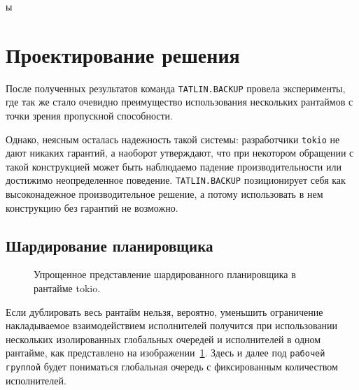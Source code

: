ы%

\section{Проектирование решения}

После полученных результатов команда \verb|TATLIN.BACKUP| провела эксперименты, где так же стало очевидно преимущество использования нескольких рантаймов с точки зрения пропускной способности.

Однако, неясным осталась надежность такой системы: разработчики \verb|tokio| не дают никаких гарантий, а наоборот утверждают, что при некотором обращении с такой конструкцией может быть наблюдаемо падение производительности или достижимо неопределенное поведение. \verb|TATLIN.BACKUP| позиционирует себя как высоконадежное производительное решение, а потому использовать в нем конструкцию без гарантий не возможно.

\subsection{Шардирование планировщика}

\begin{figure}[H]
    \begin{center}
    \end{center}

    \caption{Упрощенное представление шардированного планировщика в рантайме tokio.}
    \label{fig:tokio:duplicated_arch}
\end{figure}

Если дублировать весь рантайм нельзя, вероятно, уменьшить ограничение накладываемое взаимодействием исполнителей получится при использовании нескольких изолированных  глобальных очередей и исполнителей в одном рантайме, как представлено на изображении~\ref{fig:tokio:duplicated_arch}. Здесь и далее под \verb|рабочей группой| будет пониматься глобальная очередь с фиксированным количеством исполнителей.

